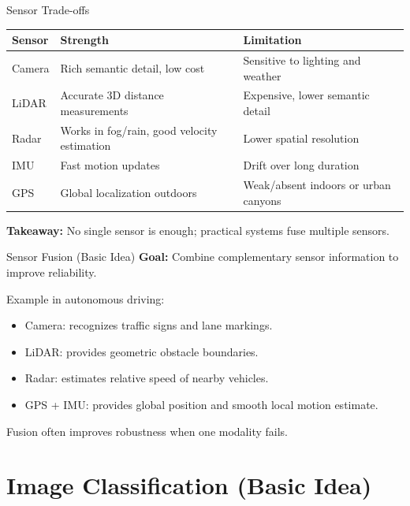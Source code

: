 \documentclass[10pt]{beamer}
\begin{document}
\begin{frame}{Sensor Trade-offs}
    \small
    \setlength{\tabcolsep}{7pt}
    \renewcommand{\arraystretch}{1.2}
    \begin{tabularx}{\textwidth}{l l X}
        \toprule
        \textbf{Sensor} & \textbf{Strength} & \textbf{Limitation} \\
        \midrule
        Camera & Rich semantic detail, low cost & Sensitive to lighting and weather \\
        LiDAR & Accurate 3D distance measurements & Expensive, lower semantic detail \\
        Radar & Works in fog/rain, good velocity estimation & Lower spatial resolution \\
        IMU & Fast motion updates & Drift over long duration \\
        GPS & Global localization outdoors & Weak/absent indoors or urban canyons \\
        \bottomrule
    \end{tabularx}

    \vspace{0.2cm}
    \textbf{Takeaway:} No single sensor is enough; practical systems fuse multiple sensors.
\end{frame}

\begin{frame}{Sensor Fusion (Basic Idea)}
    \textbf{Goal:} Combine complementary sensor information to improve reliability.

    \vspace{0.2cm}
    Example in autonomous driving:
    \begin{itemize}
        \item Camera: recognizes traffic signs and lane markings.
        \item LiDAR: provides geometric obstacle boundaries.
        \item Radar: estimates relative speed of nearby vehicles.
        \item GPS + IMU: provides global position and smooth local motion estimate.
    \end{itemize}

    \vspace{0.2cm}
    Fusion often improves robustness when one modality fails.
\end{frame}

\section{Image Classification (Basic Idea)}
\end{document}

